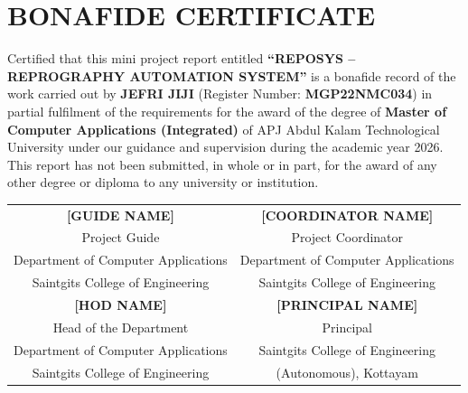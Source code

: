 \documentclass[12pt,a4paper,oneside]{report}
\begin{document}
\chapter*{BONAFIDE CERTIFICATE}
\begin{doublespace}
Certified that this mini project report entitled \textbf{``REPOSYS -- REPROGRAPHY AUTOMATION SYSTEM''} is a bonafide record of the work carried out by \textbf{JEFRI JIJI} (Register Number: \textbf{MGP22NMC034}) in partial fulfilment of the requirements for the award of the degree of \textbf{Master of Computer Applications (Integrated)} of APJ Abdul Kalam Technological University under our guidance and supervision during the academic year 2026. This report has not been submitted, in whole or in part, for the award of any other degree or diploma to any university or institution.
\end{doublespace}

\vspace{1.2in}
\begin{singlespace}
\noindent
\begin{tabular*}{\textwidth}{@{\extracolsep{\fill}}cc}
\textbf{[GUIDE NAME]} & \textbf{[COORDINATOR NAME]} \\
Project Guide & Project Coordinator \\
Department of Computer Applications & Department of Computer Applications \\
Saintgits College of Engineering & Saintgits College of Engineering \\[1.1in]
\textbf{[HOD NAME]} & \textbf{[PRINCIPAL NAME]} \\
Head of the Department & Principal \\
Department of Computer Applications & Saintgits College of Engineering \\
Saintgits College of Engineering & (Autonomous), Kottayam \\
\end{tabular*}
\end{singlespace}

\clearpage

\end{document}
